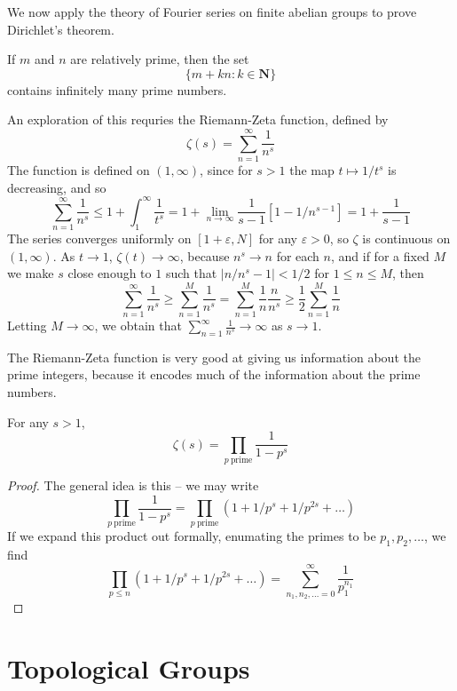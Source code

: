 We now apply the theory of Fourier series on finite abelian groups to prove Dirichlet's theorem.

\begin{theorem}
    If $m$ and $n$ are relatively prime, then the set
    \[ \{ m + kn : k \in \mathbf{N} \} \]
    contains infinitely many prime numbers.
\end{theorem}

An exploration of this requries the Riemann-Zeta function, defined by
%
\[ \zeta(s) = \sum_{n = 1}^\infty \frac{1}{n^s} \]
%
The function is defined on $(1,\infty)$, since for $s > 1$ the map $t \mapsto 1/t^s$ is decreasing, and so
%
\[ \sum_{n = 1}^\infty \frac{1}{n^s} \leq 1 + \int_{1}^\infty \frac{1}{t^s} = 1 + \lim_{n \to \infty} \frac{1}{s-1} \left[1 - 1/n^{s-1} \right] = 1 + \frac{1}{s-1} \]
%
The series converges uniformly on $[1+\varepsilon, N]$ for any $\varepsilon > 0$, so $\zeta$ is continuous on $(1,\infty)$. As $t \to 1$, $\zeta(t) \to \infty$, because $n^s \to n$ for each $n$, and if for a fixed $M$ we make $s$ close enough to $1$ such that $|n/n^s - 1| < 1/2$ for $1 \leq n \leq M$, then
%
\[ \sum_{n = 1}^\infty \frac{1}{n^s} \geq \sum_{n = 1}^M \frac{1}{n^s} = \sum_{n = 1}^M \frac{1}{n} \frac{n}{n^s} \geq \frac{1}{2} \sum_{n = 1}^M \frac{1}{n} \]
%
Letting $M \to \infty$, we obtain that $\sum_{n = 1}^\infty \frac{1}{n^s} \to \infty$ as $s \to 1$.

The Riemann-Zeta function is very good at giving us information about the prime integers, because it encodes much of the information about the prime numbers.

\begin{theorem}
    For any $s > 1$,
    \[ \zeta(s) = \prod_{p\ \text{prime}} \frac{1}{1 - p^s} \]
\end{theorem}
\begin{proof}
    The general idea is this -- we may write
    \[ \prod_{p\ \text{prime}} \frac{1}{1 - p^s} = \prod_{p\ \text{prime}} (1 + 1/p^{s} + 1/p^{2s} + \dots) \]
    If we expand this product out formally, enumating the primes to be $p_1, p_2, \dots$, we find
    \[ \prod_{p \leq n} (1 + 1/p^s + 1/p^{2s} + \dots) = \sum_{n_1, n_2, \dots = 0}^\infty \frac{1}{p_1^{n_1}} \]
\end{proof}







\chapter{Topological Groups}

